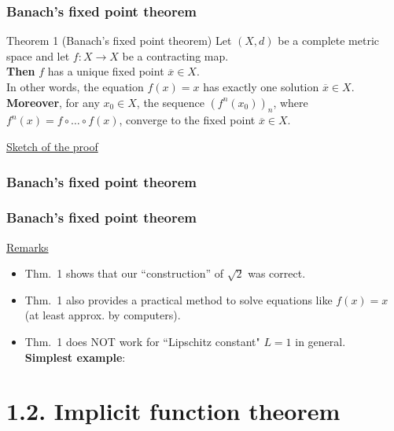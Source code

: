 \documentclass[10pt]{beamer}
\begin{document}
{\begin{frame}\frametitle{Banach's fixed point theorem}
\begin{block}{Theorem 1 (Banach's fixed point theorem)}
Let $(X,d)$ be a complete metric space and let $f:X \rightarrow X$ be a contracting map.\\
\textbf{Then} $f$ has a unique fixed point $\overline{x}\in X$.\\
In other words, the equation $f(x)=x$ has exactly one solution $\overline{x}\in X$.\\
\vspace{0.2cm}
\textbf{Moreover}, for any $x_0 \in X$, the sequence $(f^n(x_0))_n$, where $f^n(x)=f \circ \dots \circ f(x)$, converge to the fixed point $\overline{x}\in X$.
\end{block}
\underline{Sketch of the proof}\\
\vspace{4cm}
\end{frame}

\begin{frame}\frametitle{Banach's fixed point theorem}
\end{frame}


\begin{frame}\frametitle{Banach's fixed point theorem}
\underline{Remarks}
\begin{itemize}
\item Thm.~1 shows that our ``construction'' of $\sqrt{2}$ was correct.
\item Thm.~1 also provides a practical method to solve equations like $f(x)=x$\\(at least approx. by computers).
\item Thm.~1 does NOT work for ``Lipschitz constant" $L=1$ in general.\\
\vspace{0.2cm}
\textbf{Simplest example}: 
\end{itemize}
\end{frame}




\section{1.2.  Implicit function theorem}


}
\end{document}
